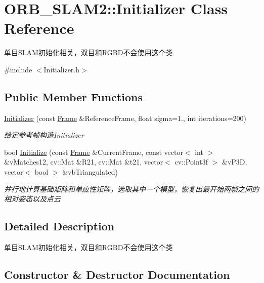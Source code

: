 \hypertarget{class_o_r_b___s_l_a_m2_1_1_initializer}{}\section{O\+R\+B\+\_\+\+S\+L\+A\+M2\+:\+:Initializer Class Reference}
\label{class_o_r_b___s_l_a_m2_1_1_initializer}


单目\+S\+L\+A\+M初始化相关，双目和\+R\+G\+B\+D不会使用这个类  




{\ttfamily \#include $<$Initializer.\+h$>$}

\subsection*{Public Member Functions}
\begin{DoxyCompactItemize}
\item 
\mbox{\hyperlink{class_o_r_b___s_l_a_m2_1_1_initializer_ac492345a970665cd8a1b1d8cf41d44af}{Initializer}} (const \mbox{\hyperlink{class_o_r_b___s_l_a_m2_1_1_frame}{Frame}} \&Reference\+Frame, float sigma=1., int iterations=200)
\begin{DoxyCompactList}\small\item\em 给定参考帧构造\+Initializer \end{DoxyCompactList}\item 
bool \mbox{\hyperlink{class_o_r_b___s_l_a_m2_1_1_initializer_a40d41840e2bdb7199ab024871d028c2c}{Initialize}} (const \mbox{\hyperlink{class_o_r_b___s_l_a_m2_1_1_frame}{Frame}} \&Current\+Frame, const vector$<$ int $>$ \&v\+Matches12, cv\+::\+Mat \&R21, cv\+::\+Mat \&t21, vector$<$ cv\+::\+Point3f $>$ \&v\+P3D, vector$<$ bool $>$ \&vb\+Triangulated)
\begin{DoxyCompactList}\small\item\em 并行地计算基础矩阵和单应性矩阵，选取其中一个模型，恢复出最开始两帧之间的相对姿态以及点云 \end{DoxyCompactList}\end{DoxyCompactItemize}


\subsection{Detailed Description}
单目\+S\+L\+A\+M初始化相关，双目和\+R\+G\+B\+D不会使用这个类 

\subsection{Constructor \& Destructor Documentation}
\mbox{\label{class_o_r_b___s_l_a_m2_1_1_initializer_ac492345a970665cd8a1b1d8cf41d44af}} 
